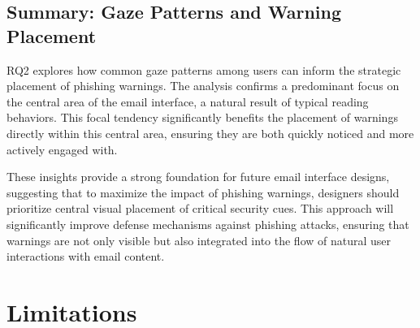 \documentclass[
  a4paper,  %
  twoside,  %
  bibliography=totoc,
  headsepline,
  cleardoublepage=empty,
  parskip=half,
  draft=false
]{scrbook}
\begin{document}
\subsection{Summary: Gaze Patterns and Warning Placement}

RQ2 explores how common gaze patterns among users can inform the strategic placement of phishing warnings. The analysis confirms a predominant focus on the central area of the email interface, a natural result of typical reading behaviors. This focal tendency significantly benefits the placement of warnings directly within this central area, ensuring they are both quickly noticed and more actively engaged with.

These insights provide a strong foundation for future email interface designs, suggesting that to maximize the impact of phishing warnings, designers should prioritize central visual placement of critical security cues. This approach will significantly improve defense mechanisms against phishing attacks, ensuring that warnings are not only visible but also integrated into the flow of natural user interactions with email content.







\section{Limitations}
\end{document}
